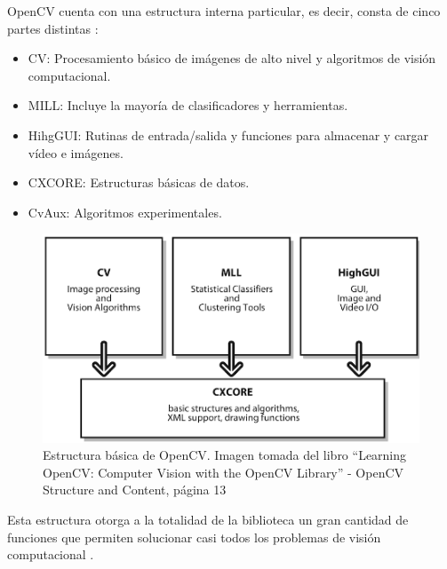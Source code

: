OpenCV cuenta con una estructura interna particular, es decir, consta de cinco partes distintas \citep{libroopencv}:
\begin{itemize}
\item CV: Procesamiento básico de imágenes de alto nivel y algoritmos de visión computacional.
\item MILL: Incluye la mayoría de clasificadores y herramientas.
\item HihgGUI: Rutinas de entrada/salida y funciones para almacenar y cargar vídeo e imágenes.
\item CXCORE: Estructuras básicas de datos.
\item CvAux: Algoritmos experimentales.
\end{itemize}

\begin{figure}
\centering
\includegraphics[scale = 0.7]{capitulo_02/figuras_dir/estructura.jpg}
\caption{Estructura básica de OpenCV. Imagen tomada del libro ``Learning OpenCV: Computer Vision with the OpenCV Library'' - OpenCV Structure and Content, página 13}
\label{fig:figura3}
\end{figure}

Esta estructura otorga a la totalidad de la biblioteca un gran cantidad de funciones que permiten solucionar casi todos los problemas de visión computacional \citep{arevalo2004libreria}. 

